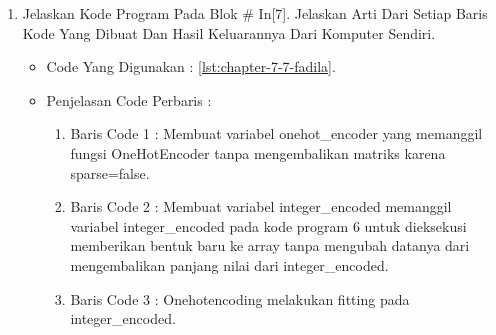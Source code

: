\begin{enumerate}
\begin{itemize}
\par
\item Penjelasan Code Perbaris	: 
\begin{enumerate}
\item Baris Code 1	: Membuat variabel label\_encoder dengan penerapan modul / fungsi dari LabelEncoder tanpa parameter
\item Baris Code 2	: Membuat variabel integer\_encoded dengan penerapan fungsi label\_encoder.fit\_transform (ekstrasi fitur object ) dari variabel classes yang akan mengembalikan beberapa data yang diubah kembali.
\end{enumerate}
\par
\item Hasil : \ref{chapter-7-in-6-fadila}
\par
\par
\begin{figure}[!hbtp]
\centering
\texttt{[image: figures/chapter-7-in-6-fadila.jpg]}
\caption{Code Program Pada In [6] - fadila}
\label{chapter-7-in-6-fadila}
\end{figure}
\par
\par
\end{itemize}
\par
\par
\par
\item Jelaskan Kode Program Pada Blok \# In[7]. Jelaskan Arti Dari Setiap Baris Kode Yang Dibuat Dan Hasil Keluarannya Dari Komputer Sendiri.
\begin{itemize}
\item Code Yang Digunakan : \ref{lst:chapter-7-7-fadila}.

\par
\par
\item Penjelasan Code Perbaris	: 
\begin{enumerate}
\item Baris Code 1	: Membuat variabel onehot\_encoder yang memanggil fungsi OneHotEncoder tanpa mengembalikan matriks karena sparse=false.
\item Baris Code 2	: Membuat variabel integer\_encoded memanggil variabel integer\_encoded pada kode program 6 untuk dieksekusi memberikan bentuk baru ke array tanpa mengubah datanya dari mengembalikan panjang nilai dari integer\_encoded.
\item Baris Code 3	: Onehotencoding melakukan fitting pada integer\_encoded.

\end{enumerate}
\end{itemize}
\end{enumerate}
